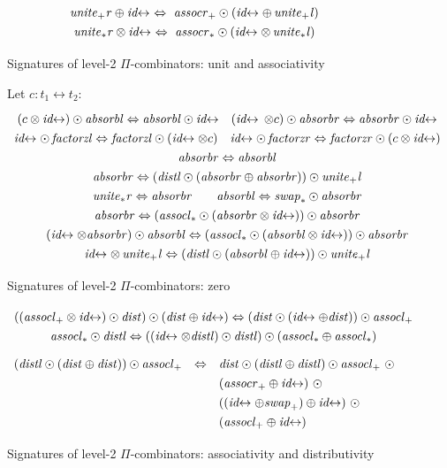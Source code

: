 \documentclass{article}
\newcommand{\identlp}{\mathit{unite}_+\mathit{l}}
\newcommand{\identlsp}{\mathit{unite}_+\mathit{r}}
\newcommand{\swapp}{\mathit{swap}_+}
\newcommand{\assoclp}{\mathit{assocl}_+}
\newcommand{\assocrp}{\mathit{assocr}_+}
\newcommand{\identlt}{\mathit{unite}_*\mathit{l}}
\newcommand{\identlst}{\mathit{unite}_*\mathit{r}}
\newcommand{\swapt}{\mathit{swap}_*}
\newcommand{\assoclt}{\mathit{assocl}_*}
\newcommand{\assocrt}{\mathit{assocr}_*}
\newcommand{\absorbr}{\mathit{absorbr}}
\newcommand{\absorbl}{\mathit{absorbl}}
\newcommand{\factorzr}{\mathit{factorzr}}
\newcommand{\factorzl}{\mathit{factorzl}}
\newcommand{\dist}{\mathit{dist}}
\newcommand{\distl}{\mathit{distl}}
\newcommand{\idc}{\mathit{id}\!\!\leftrightarrow}
\begin{document}
\begin{figure}[t]
\[\def\arraystretch{1.3}
\begin{array}{c}
  {\identlsp \oplus \idc ~\Leftrightarrow~ \assocrp \odot (\idc \oplus \, \identlp)}
\\
  {\identlst \otimes \idc ~\Leftrightarrow~ \assocrt \odot (\idc \otimes \, \identlt)}
\end{array}\]
\caption{\label{figd}Signatures of level-2 $\Pi$-combinators: unit and associativity}
\end{figure}


\begin{figure}[t]
Let $c : t_1 \leftrightarrow t_2$:
\[\def\arraystretch{1.3}
\begin{array}{c}
  {(c \otimes \idc) \odot \absorbl \Leftrightarrow \absorbl \odot \idc}
\quad
  {(\idc \, \otimes c) \odot \absorbr \Leftrightarrow \absorbr \odot \idc}
\\
  {\idc \odot \, \factorzl \Leftrightarrow \factorzl \odot (\idc \otimes c)}
\quad
  {\idc \odot \, \factorzr \Leftrightarrow \factorzr \odot (c \otimes \idc)}
\\
  {\absorbr \Leftrightarrow \absorbl}
\\
  {\absorbr \Leftrightarrow (\distl \odot (\absorbr \oplus \absorbr)) \odot \identlp}
\\
  {\identlst \Leftrightarrow \absorbr}
\qquad
  {\absorbl \Leftrightarrow \swapt \odot \absorbr}
\\
  {\absorbr \Leftrightarrow (\assoclt \odot (\absorbr \otimes \idc)) \odot \absorbr}
\\
  {(\idc \otimes \absorbr) \odot \absorbl \Leftrightarrow (\assoclt \odot (\absorbl \otimes \idc)) \odot \absorbr}
\\
  {\idc \otimes \, \identlp \Leftrightarrow (\distl \odot (\absorbl \oplus \idc)) \odot \identlp}
\end{array}\]
\caption{\label{figc}Signatures of level-2 $\Pi$-combinators: zero}
\end{figure}

\begin{figure}[t]
\[\def\arraystretch{1.3}
\begin{array}{c}
  {((\assoclp \otimes \idc) \odot \dist) \odot (\dist \oplus \idc) \Leftrightarrow (\dist \odot (\idc \oplus \dist)) \odot \assoclp}
\\
  {\assoclt \odot \distl \Leftrightarrow ((\idc \otimes \distl) \odot \distl) \odot (\assoclt \oplus \assoclt)}
\end{array}\]
\vspace{ -0.5em}
\[\def\arraystretch{1.3}
\begin{array}{rcl}
  (\distl \odot (\dist \oplus \dist)) \odot \assoclp &\Leftrightarrow&
   \dist \odot (\distl \oplus \distl) \odot \assoclp ~\odot \\
&& (\assocrp \oplus \idc) ~\odot \\
&& ((\idc \oplus \swapp) \oplus \idc) ~\odot \\
&&      (\assoclp \oplus \idc)
\end{array}\]
\caption{\label{figb}Signatures of level-2 $\Pi$-combinators: associativity and distributivity}
\end{figure}
\end{document}
